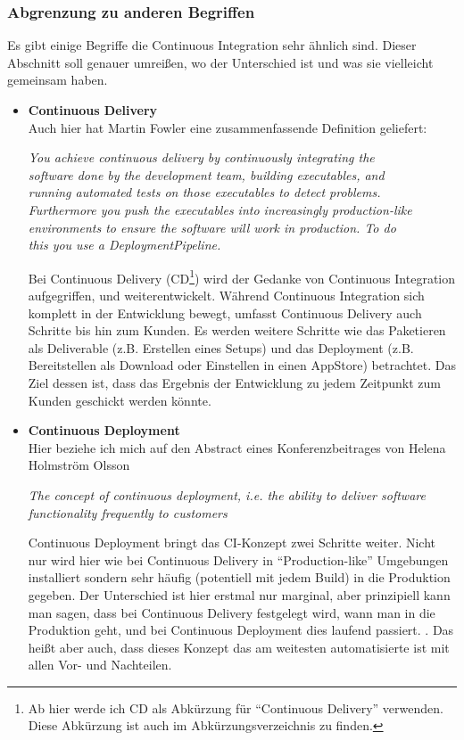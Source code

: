 \subsubsection*{Abgrenzung zu anderen Begriffen}
Es gibt einige Begriffe die Continuous Integration sehr ähnlich sind. Dieser Abschnitt soll genauer umreißen, wo der Unterschied ist und was sie vielleicht gemeinsam haben.
\begin{itemize}
	\item\textbf{Continuous Delivery}\\
	Auch hier hat Martin Fowler eine zusammenfassende Definition geliefert:
\begin{center}
	\textit{
	You achieve continuous delivery by continuously integrating the \\software done by the development team, building executables, and\\ running automated tests on those executables to detect problems. \\Furthermore you push the executables into increasingly production-like \\environments to ensure the software will work in production. To do \\this you use a DeploymentPipeline.}\\ \cite{fowler-CD}
\end{center}
	Bei Continuous Delivery (CD\footnote{Ab hier werde ich CD als Abkürzung für "`Continuous Delivery"' verwenden. Diese Abkürzung ist auch im Abkürzungsverzeichnis zu finden.}) wird der Gedanke von Continuous Integration aufgegriffen, und weiterentwickelt. Während Continuous Integration sich komplett in der Entwicklung bewegt, umfasst Continuous Delivery auch Schritte bis hin zum Kunden. Es werden weitere Schritte wie das Paketieren als Deliverable (z.B. Erstellen eines Setups) und das Deployment (z.B. Bereitstellen als Download oder Einstellen in einen AppStore) betrachtet. Das Ziel dessen ist, dass das Ergebnis der Entwicklung zu jedem Zeitpunkt zum Kunden geschickt werden könnte.\\
	\item\textbf{Continuous Deployment}\\
	Hier beziehe ich mich auf den Abstract eines Konferenzbeitrages von Helena Holmström Olsson
	\begin{center}
		\textit{
		The concept of continuous deployment, i.e. the ability to deliver software functionality frequently to customers \textelp{}}\\
		\cite{olsson2012climbing}
	\end{center}
	Continuous Deployment bringt das CI-Konzept zwei Schritte weiter. Nicht nur wird hier wie bei Continuous Delivery in "`Production-like"' Umgebungen installiert sondern sehr häufig (potentiell mit jedem Build) in die Produktion gegeben. Der Unterschied ist hier erstmal nur marginal, aber prinzipiell kann man sagen, dass bei Continuous Delivery festgelegt wird, wann man in die Produktion geht, und bei Continuous Deployment dies laufend passiert. \cite{scrum-overview-ci-cd}. Das heißt aber auch, dass dieses Konzept das am weitesten automatisierte ist mit allen Vor- und Nachteilen.
	

\end{itemize}
